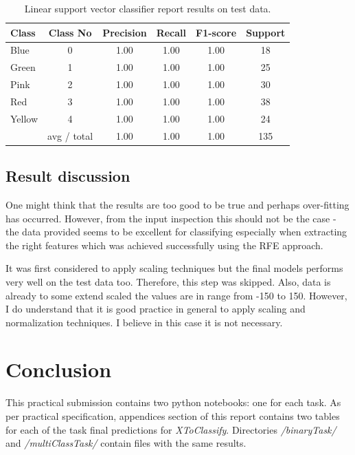 \documentclass[11pt]{article}
\begin{document}
			\begin{center}
			  	\begin{table}[h]
			  	\centering
				\begin{tabular}[b]{| l | c | c | c | c | c |}
					\hline
					Class & Class No & Precision &  Recall & F1-score & Support  \\
		 			\hline
					Blue  & 0  &   1.00   &   1.00   &   1.00   &   18 \\
          			Green & 1  &   1.00   &   1.00   &   1.00   &   25 \\
         			Pink  & 2  &   1.00   &   1.00   &   1.00   &   30 \\
          			Red  & 3  &   1.00   &   1.00   &   1.00   &   38 \\
          			Yellow & 4  &   1.00   &   1.00   &   1.00   &  24 \\
          			\hline
					 & avg / total   &   1.00   &   1.00   &   1.00  &  135 \\
					\hline
				\end{tabular}
				\caption{Linear support vector classifier report results on test data.}
				\label{tbl:vector_resuts_multi_testing}
				\end{table}
			\end{center}
			\vspace*{-1.3cm}

		\subsection{Result discussion}
			One might think that the results are too good to be true and perhaps over-fitting has occurred. However, from the input inspection this should not be the case - the data provided seems to be excellent for classifying especially when extracting the right features which was achieved successfully using the RFE approach. 

			It was first considered to apply scaling techniques but the final models performs very well on the test data too. Therefore, this step was skipped. Also, data is already to some extend scaled the values are in range from -150 to 150. However, I do understand that it is good practice in general to apply scaling and normalization techniques. I believe in this case it is not necessary. 

	\section{Conclusion}
		This practical submission contains two python notebooks: one for each task. As per practical specification, appendices section of this report contains two tables for each of the task final predictions for \textit{XToClassify}. Directories \textit{/binaryTask/} and \textit{/multiClassTask/} contain files with the same results. 
\end{document}

